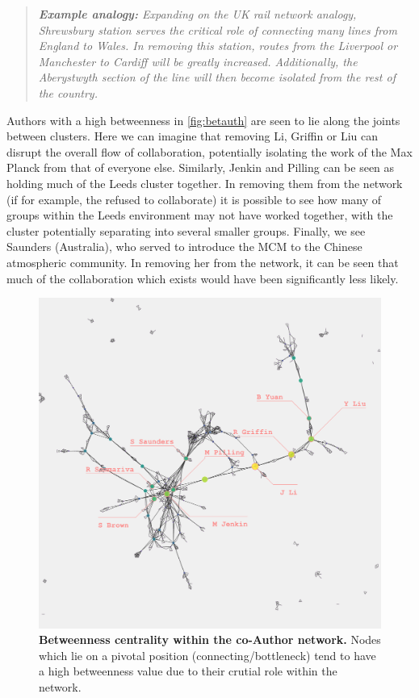 \begin{quote}
\textit{
\textbf{Example analogy:} Expanding on the UK rail network analogy, Shrewsbury station serves the critical role of connecting many lines from England to Wales. In removing this station, routes from the Liverpool or Manchester to Cardiff will be greatly increased. Additionally, the Aberystwyth section of the line will then become isolated from the rest of the country.
}
\end{quote}

Authors with a high betweenness in \autoref{fig:betauth} are seen to lie along the joints between clusters. Here we can imagine that removing Li, Griffin or Liu can disrupt the overall flow of collaboration, potentially isolating the work of the Max Planck from that of everyone else. Similarly, Jenkin and Pilling can be seen as holding much of the Leeds cluster together. In removing them from the network (if for example, the refused to collaborate) it is possible to see how many of groups within the Leeds environment may not have worked together, with the cluster potentially separating into several smaller groups. Finally, we see Saunders (Australia), who served to introduce the MCM to the Chinese atmospheric community. In removing her from the network, it can be seen that much of the collaboration which exists would have been significantly less likely.  

\begin{figure}[H]
     \centering
         \includegraphics[width=.8\textwidth]{figures_c3/betweenauthor.png}
         
        \caption{ \textbf{Betweenness centrality within the co-Author network.} Nodes which lie on a pivotal position (connecting/bottleneck) tend to have a high betweenness value due to their crutial role within the network.}
        \label{fig:betauth}
\end{figure}


